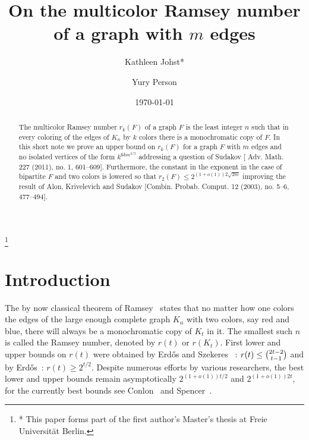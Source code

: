 \documentclass[reqno]{amsart}
\theoremstyle{remark}
\begin{document}
\title[Multicolor Ramsey Numbers]{On the multicolor Ramsey number of a graph with $m$ edges}
\author[Kathleen Johst]{Kathleen Johst*}
\address{Freie Universit\"at Berlin, Institut f\"ur Mathematik,  
 Berlin, Germany}
\author[Yury Person]{Yury Person}
\address{Goethe-Universit\"at, Institut f\"ur Mathematik,
  Robert-Mayer-Str. 10, 60325 Frankfurt am Main, Germany}

\thanks{
* This paper forms part of the first author's Master's thesis  at Freie Universit\"at Berlin.
}


\date{\today}

\begin{abstract}
  The multicolor Ramsey number $r_k(F)$ of a graph $F$ is the least integer $n$ such that 
in every coloring of the edges of $K_n$ by $k$ colors there is a monochromatic copy of $F$. In this short note 
we prove an upper bound on $r_k(F)$ for a graph $F$ with $m$ edges and no isolated vertices of the form $k^{6km^{2/3}}$ addressing a question of Sudakov [ Adv. Math. 227 (2011), no. 1,
601--609]. 
Furthermore, the constant in the exponent in the case of bipartite $F$ and two colors is lowered so that  $r_2(F)\le 2^{(1+o(1))2\sqrt{2m}}$ 
improving the result of Alon, Krivelevich and Sudakov [Combin. Probab. Comput. 12 (2003), no. 5--6, 477--494].
\end{abstract}


\maketitle

\section{Introduction}
 The by now classical theorem of Ramsey~\cite{Ram30} states that no matter how one colors 
the edges of the large enough complete graph $K_n$ with two colors, say red and blue, there will always be a 
monochromatic copy of $K_t$ in it. The smallest such $n$ is called the Ramsey number, denoted by $r(t)$  or $r(K_t)$. 
 First lower and upper bounds on $r(t)$ were obtained by Erd\H{o}s and Szekeres~
\cite{ErdSze35}: $r(t)\le \tbinom{2t-2}{t-1}$ and by 
 Erd\H{o}s~\cite{Erd47}: $r(t)\ge 2^{t/2}$. 
 Despite numerous efforts by various researchers, the best lower and upper bounds remain asymptotically $2^{(1+o(1))t/2}$ and $2^{(1+o(1))2t}$, for the 
currently best bounds see Conlon~\cite{Con09} and Spencer~\cite{Spe75}. 
\end{document}
